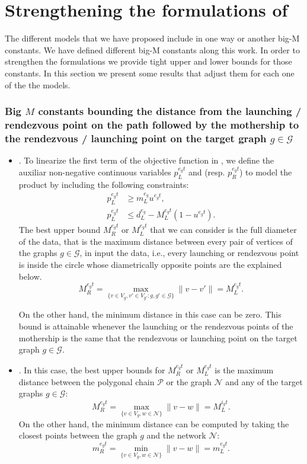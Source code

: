 \section{Strengthening the formulations of \MDR}\label{bounds}
\noindent
The different models that we have proposed include in one way or another big-M constants. We have defined different big-M constants along this work. In order to strengthen the formulations we provide tight upper and lower bounds for those constants. In this section we present some results that adjust them for each one of the the models.

\subsubsection*{Big $M$ constants bounding the distance from the launching / rendezvous point on the path followed by the mothership to the rendezvous / launching point on the target graph $g\in \mathcal{G}$}
\begin{itemize}
\item \underline{\AMD}. To linearize the first term of the objective function in \AMD, we define the auxiliar non-negative continuous variables $p_L^{e_gt}$ and (resp. $p_R^{e_gt}$) to model the product by including the following constraints:
\begin{align*}
p_L^{e_gt} & \geq m_L^{e_g} u^{e_gt}, \\
p_L^{e_gt} & \leq d_L^{e_g} - M_L^{e_gt}(1-u^{e_gt}).
\end{align*}
The best upper bound $M_R^{e_gt}$ or $M_L^{e_gt}$ that we can consider is the full diameter of the data, that is the maximum distance between every pair of vertices of the graphs $g\in \mathcal{G}$, in input the data, i.e., every launching or rendezvous point is inside the circle whose diametrically opposite points are the explained below. 
$$
M_R^{e_gt} = \max_{\{v\in V_g, v'\in V_{g'} : g, g'\in\mathcal G\}} \|v - v'\| = M_L^{e_gt}.
$$

On the other hand, the minimum distance in this case can be zero. This bound is attainable whenever the launching or the rendezvous points of the mothership is the same that the rendezvous or launching point on the target graph $g\in \mathcal{G}$.

\item \underline{\NMD}. In this case, the best upper bounds for $M_R^{e_gt}$ or $M_L^{e_gt}$ is the maximum distance between the polygonal chain $\mathcal{P}$ or the graph $\mathcal{N}$ and any of the target graphs $g\in \mathcal{G}$:
$$
M_R^{e_gt} = \max_{\{v\in V_g, w\in \mathcal N\}}\|v - w\| = M_L^{i_gt}.
$$
On the other hand, the minimum distance can be computed by taking the closest points between the graph $g$ and the network $\mathcal{N}$:
$$
m_R^{e_gt} = \min_{\{v\in V_g, w\in \mathcal N\}}\|v - w\| = m_L^{e_gt}.
$$
\end{itemize}

